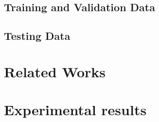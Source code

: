 \documentclass{article}
\begin{document}
\begin{multicols*}{2}
\subsection{Training and Validation Data} 


\subsection{Testing Data} 



\section{Related Works}



\section{Experimental results}
\label{'Results'}



\nocite{*}



\end{multicols*}
\end{document}
